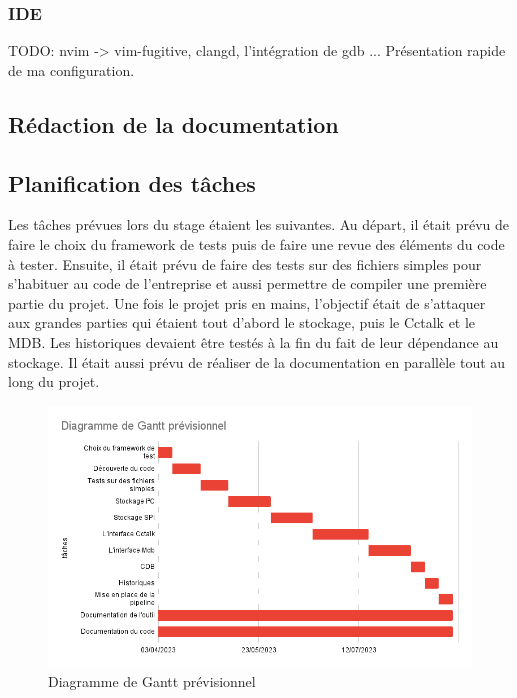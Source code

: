 \documentclass[a4paper]{article}
\begin{document}
\subsubsection{IDE}%

TODO: nvim -> vim-fugitive, clangd, l'intégration de gdb ... Présentation rapide
de ma configuration.
\subsection{Rédaction de la documentation}%
\clearpage
\subsection{Planification des tâches}%

Les tâches prévues lors du stage étaient les suivantes. Au départ, il était
prévu de faire le choix du framework de tests puis de faire une revue des
éléments du code à tester. Ensuite, il était prévu de faire des tests sur des
fichiers simples pour s'habituer au code de l'entreprise et aussi permettre de
compiler une première partie du projet. Une fois le projet pris en mains,
l'objectif était de s'attaquer aux grandes parties qui étaient tout d'abord le
stockage, puis le Cctalk et le MDB. Les historiques devaient être testés à la
fin du fait de leur dépendance au stockage. Il était aussi prévu de réaliser de
la documentation en parallèle tout au long du projet.

\begin{figure}[h!]
  \begin{center}
  \includegraphics[scale=0.6]{./img/expected-gantt.png}
  \caption{Diagramme de Gantt prévisionnel}
  \end{center}
\end{figure}
\end{document}
